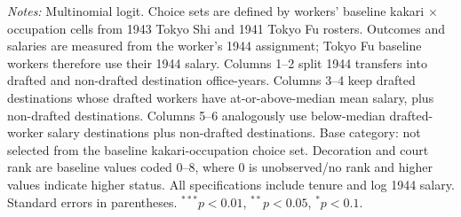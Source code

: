 \begin{table}[htbp]
\centering
\caption{Selection into 1944 Destinations by Destination Draftee Salary}
\label{tab:selection-1944-kakari-occ-destination-wage}
\scriptsize
\begin{threeparttable}
\begin{tablenotes}[flushleft]\footnotesize
\item \textit{Notes:} Multinomial logit. Choice sets are defined by workers' baseline kakari $\times$ occupation cells from 1943 Tokyo Shi and 1941 Tokyo Fu rosters. Outcomes and salaries are measured from the worker's 1944 assignment; Tokyo Fu baseline workers therefore use their 1944 salary. Columns 1--2 split 1944 transfers into drafted and non-drafted destination office-years. Columns 3--4 keep drafted destinations whose drafted workers have at-or-above-median mean salary, plus non-drafted destinations. Columns 5--6 analogously use below-median drafted-worker salary destinations plus non-drafted destinations. Base category: not selected from the baseline kakari-occupation choice set. Decoration and court rank are baseline values coded 0--8, where 0 is unobserved/no rank and higher values indicate higher status. All specifications include tenure and log 1944 salary. Standard errors in parentheses. $^{***}p<0.01$, $^{**}p<0.05$, $^{*}p<0.1$.
\end{tablenotes}\end{threeparttable}\end{table}

